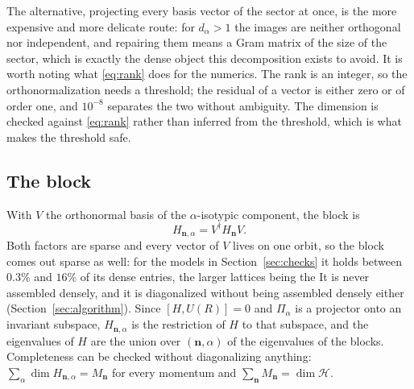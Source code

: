 \documentclass[12pt]{article}
\newcommand{\Hil}{\mathscr{H}}
\begin{document}
The alternative, projecting every basis vector of the sector at once, is the more
expensive and more delicate route: for $d_\alpha > 1$ the images are neither
orthogonal nor independent, and repairing them means a Gram matrix of the size of
the sector, which is exactly the dense object this decomposition exists to avoid.
It is worth noting what \eqref{eq:rank} does for the numerics. The rank is an
integer, so the orthonormalization needs a threshold; the residual of a vector is
either zero or of order one, and $10^{-8}$ separates the two without ambiguity.
The dimension is checked against \eqref{eq:rank} rather than inferred from the
threshold, which is what makes the threshold safe.

\subsection{The block}

With $V$ the orthonormal basis of the $\alpha$-isotypic component, the block is
\begin{equation}
  H_{\mathbf{n},\alpha} = V^{\dagger}H_{\mathbf{n}}V .
  \label{eq:block}
\end{equation}
Both factors are sparse and every vector of $V$ lives on one orbit, so the block
comes out sparse as well: for the models in Section~\ref{sec:checks} it holds
between $0.3\%$ and $16\%$ of its dense entries, the larger lattices being the It is never assembled densely,
and it is diagonalized without being assembled densely either
(Section~\ref{sec:algorithm}).
Since $[H,U(R)] = 0$ and $\Pi_\alpha$ is a projector onto an invariant subspace,
$H_{\mathbf{n},\alpha}$ is the restriction of $H$ to that subspace, and the
eigenvalues of $H$ are the union over $(\mathbf{n},\alpha)$ of the eigenvalues of
the blocks. Completeness can be checked without diagonalizing anything:
$\sum_\alpha \dim H_{\mathbf{n},\alpha} = M_{\mathbf{n}}$ for every momentum and
$\sum_{\mathbf{n}} M_{\mathbf{n}} = \dim\Hil$.
\end{document}
